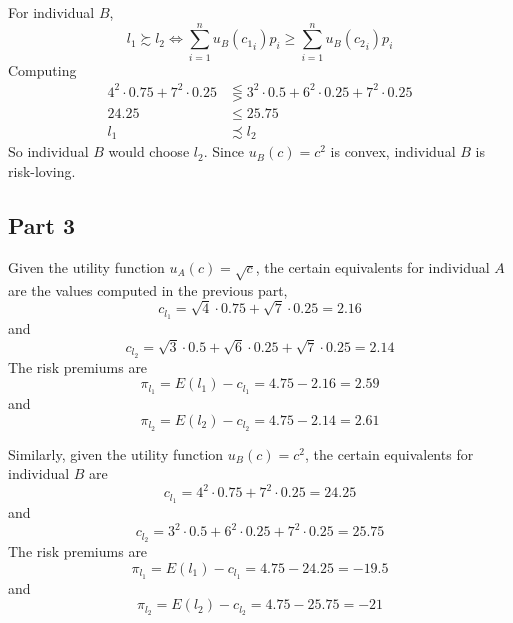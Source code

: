 \documentclass[12pt]{extarticle}
\numberwithin{table}{section}
\numberwithin{figure}{section}
\numberwithin{equation}{section}
\begin{document}
For individual $B$,
\begin{equation}
    l_1 \succsim l_2 \iff \sum_{i = 1}^n u_B({c_1}_i)p_i \ge \sum_{i = 1}^n u_B({c_2}_i) p_i
\end{equation}
Computing
\begin{align}
    4^2 \cdot 0.75 + 7^2 \cdot 0.25 & \lesseqgtr 3^2 \cdot 0.5 + 6^2 \cdot 0.25 + 7^2 \cdot 0.25 \\
    24.25                           & \le 25.75                                                  \\
    l_1                             & \precsim l_2
\end{align}
So individual $B$ would choose $l_2$. Since $u_B(c) = c^2$ is convex, individual $B$ is risk-loving.

\subsection*{Part 3}
Given the utility function $u_A(c) = \sqrt c$,
the certain equivalents for individual $A$ are the values computed in the previous part,
\begin{equation}
    c_{l_1} = \sqrt4 \cdot 0.75 + \sqrt7 \cdot 0.25 = 2.16
\end{equation}
and
\begin{equation}
    c_{l_2} = \sqrt3 \cdot 0.5 + \sqrt6 \cdot 0.25 + \sqrt7 \cdot 0.25 = 2.14
\end{equation}
The risk premiums are
\begin{equation}
    \pi_{l_1} = E(l_1) - c_{l_1} = 4.75 - 2.16 = 2.59
\end{equation}
and
\begin{equation}
    \pi_{l_2} = E(l_2) - c_{l_2} = 4.75 - 2.14 = 2.61
\end{equation}

Similarly, given the utility function $u_B(c) = c^2$, the certain equivalents for individual $B$ are
\begin{equation}
    c_{l_1} = 4^2 \cdot 0.75 + 7^2 \cdot 0.25 = 24.25
\end{equation}
and
\begin{equation}
    c_{l_2} = 3^2 \cdot 0.5 + 6^2 \cdot 0.25 + 7^2 \cdot 0.25 = 25.75
\end{equation}
The risk premiums are
\begin{equation}
    \pi_{l_1} = E(l_1) - c_{l_1} = 4.75 - 24.25 = -19.5
\end{equation}
and
\begin{equation}
    \pi_{l_2} = E(l_2) - c_{l_2} = 4.75 - 25.75 = -21
\end{equation}
\end{document}
